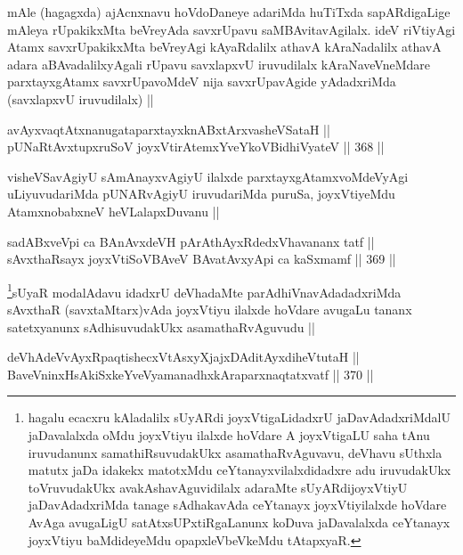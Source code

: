 \begin{artha}
mAle (hagagxda) ajAcnxnavu hoVdoDaneye adariMda huTiTxda sapARdigaLige mAleya rUpakikxMta beVreyAda savxrUpavu saMBAvitavAgilalx. ideV riVtiyAgi Atamx savxrUpakikxMta beVreyAgi kAyaRdalilx athavA kAraNadalilx athavA adara aBAvadalilxyAgali rUpavu savxlapxvU iruvudilalx kAraNaveVneMdare parxtayxgAtamx savxrUpavoMdeV nija savxrUpavAgide yAdadxriMda (savxlapxvU iruvudilalx) ||
\end{artha}

\begin{shl}
avAyxvaqtAtxnanugataparxtayxknABxtArxvasheVSataH || \\
pUNaRtAvxtupxruSoV joyxVtirAtemxYveYkoV\s BidhiVyateV ||  368 || 
\end{shl}

\begin{artha}
visheVSavAgiyU sAmAnayxvAgiyU ilalxde parxtayxgAtamxvoMdeVyAgi uLiyuvudariMda pUNARvAgiyU iruvudariMda puruSa, joyxVtiyeMdu AtamxnobabxneV heVLalapxDuvanu ||
\end{artha}

\begin{shl}
sadABxveV\s pi ca BAnAvxdeVH pArAthAyxRdedxVhavananx tatf || \\
sAvxthaRsayx joyxVtiSoV\s BAveV BAvatAvxyApi ca kaSxmamf ||  369 ||  
\end{shl}

\begin{artha}
\footnote{hagalu ecacxru kAladalilx sUyARdi joyxVtigaLidadxrU jaDavAdadxriMdalU jaDavalalxda oMdu joyxVtiyu ilalxde hoVdare A joyxVtigaLU saha tAnu iruvudanunx samathiRsuvudakUkx asamathaRvAguvavu, deVhavu sUthxla matutx jaDa idakekx matotxMdu ceYtanayxvilalxdidadxre adu iruvudakUkx toVruvudakUkx avakAshavAguvidilalx adaraMte sUyARdijoyxVtiyU jaDavAdadxriMda tanage sAdhakavAda ceYtanayx joyxVtiyilalxde hoVdare AvAga avugaLigU satAtxsUPxtiRgaLanunx koDuva jaDavalalxda ceYtanayx joyxVtiyu baMdideyeMdu opapxleVbeVkeMdu tAtapxyaR.}sUyaR modalAdavu idadxrU deVhadaMte parAdhiVnavAdadadxriMda sAvxthaR (savxtaMtarx)vAda joyxVtiyu ilalxde hoVdare avugaLu tananx satetxyanunx sAdhisuvudakUkx asamathaRvAguvudu ||
\end{artha}

\begin{shl}
deVhAdeVvAyxRpaqtishecxVtAsxyXjajxDAditAyxdiheVtutaH || \\
BaveVninxHsAkiSxkeYveVyamanadhxkAraparxnaqtatxvatf ||  370 || 
\end{shl}

